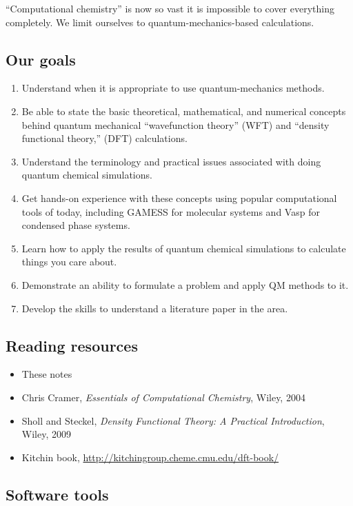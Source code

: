 \documentclass[11pt]{article}
\begin{document}
``Computational chemistry'' is now so vast it is impossible to cover
everything completely.  We limit ourselves to quantum-mechanics-based
calculations.


\subsection{Our goals}
\label{sec-1-3}

\begin{enumerate}
\item Understand when it is appropriate to use quantum-mechanics
methods.
\item Be able to state the basic theoretical, mathematical, and numerical
concepts behind quantum mechanical ``wavefunction theory'' (WFT) and
``density functional theory,'' (DFT) calculations.
\item Understand the terminology and practical issues associated with doing quantum chemical simulations.
\item Get hands-on experience with these concepts using popular
computational tools of today, including GAMESS for molecular
systems and Vasp for condensed phase systems.
\item Learn how to apply the results of quantum chemical
simulations to calculate
things you care about.
\item Demonstrate an ability to formulate a problem and apply QM
methods to it.
\item Develop the skills to understand a literature paper in the area.
\end{enumerate}

\subsection{Reading resources}
\label{sec-1-4}
\begin{itemize}
\item These notes
\item Chris Cramer, \emph{Essentials of Computational Chemistry}, Wiley, 2004
\item Sholl and Steckel, \emph{Density Functional Theory: A Practical
Introduction}, Wiley, 2009
\item Kitchin book, \url{http://kitchingroup.cheme.cmu.edu/dft-book/}
\end{itemize}

\subsection{Software tools}
\label{sec-1-5}
\end{document}
